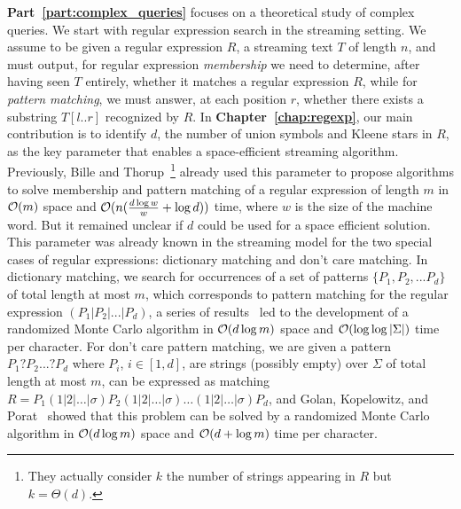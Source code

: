 \textbf{Part~\ref{part:complex_queries}} focuses on a theoretical study of complex queries. 
%
We start with regular expression search in the streaming setting.
%
We assume to be given a regular expression $R$, a streaming text $T$ of length $n$, and must output, for regular expression \emph{membership} we need to determine, after having seen $T$ entirely, whether it matches a regular expression $R$, while for \emph{pattern matching}, we must answer, at each position $r$, whether there exists a substring $T[l..r]$ recognized by $R$.
In \textbf{Chapter~\ref{chap:regexp}}, our main contribution is to identify $d$, the number of union symbols and Kleene stars in $R$, as the key parameter that enables a space-efficient streaming algorithm. 
Previously, Bille and Thorup~\cite{doi:10.1137/1.9781611973075.104}\footnote{They actually consider $k$ the number of strings appearing in $R$ but $k=\Theta(d)$.} already used this parameter to propose algorithms to solve membership and pattern matching of a regular expression of length $m$ in $\mathcal{O}(m)$ space and $\mathcal{O}(n(\frac{d\log w}{w} + \log d))$ time, where $w$ is the size of the machine word. But it remained unclear if $d$ could be used for a space efficient solution.
This parameter was already known in the streaming model for the two special cases of regular expressions: dictionary matching and don't care matching. In dictionary matching, we search for occurrences of a set of patterns $\{P_1, P_2, ... P_d \}$ of total length at most $m$, which corresponds to pattern matching for the regular expression $(P_1| P_2| ... | P_d)$, a series of results~\cite{Porat:09,DBLP:journals/talg/BreslauerG14,DBLP:conf/esa/CliffordFPSS15,DBLP:conf/esa/GolanP17,DBLP:conf/icalp/GolanKP18} led to the development of a randomized Monte Carlo algorithm in $\mathcal{O}(d\log m)$ space and $\mathcal{O}(\log \log |\Sigma|)$ time per character.
For don't care pattern matching, we are given a pattern $P_1 ? P_2 ... ? P_d$ where $P_i$, $i \in [1,d]$, are strings (possibly empty) over $\Sigma$ of total length at most $m$, can be expressed as matching $R = P_1 (1|2|\ldots|\sigma) P_2 (1|2|\ldots|\sigma) \ldots (1|2|\ldots|\sigma) P_{d}$, and Golan, Kopelowitz, and Porat~\cite{DBLP:journals/algorithmica/GolanKP19} showed that this problem can be solved by a randomized Monte Carlo algorithm in $\mathcal{O}(d \log m)$ space and $\mathcal{O}(d+\log m)$ time per character.

